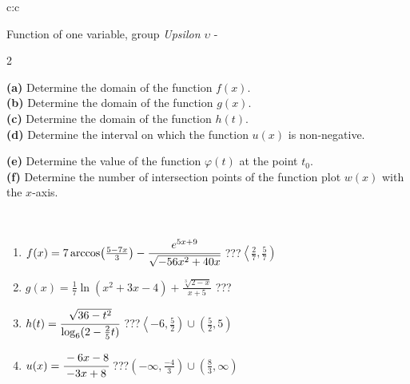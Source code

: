 \documentclass[10pt]{report}
\begin{document}
\begin{tabular}{c:c}
\begin{minipage}[c][104.5mm][t]{0.5\linewidth}
\begin{center}
\vspace{7mm}
{\huge Function of one variable, group \textit{Upsilon $\upsilon$} -}\\[5mm]
\begin{minipage}{0.95\linewidth}
\begin{center}
{\small \begin{multicols}{2} \raggedright
\textbf{(a)} Determine the domain of the function \(f(x)\). \\[1mm]
\textbf{(b)} Determine the domain of the function \(g(x)\). \\[1mm]
\textbf{(c)} Determine the domain of the function \(h(t)\). \\[1mm]
\textbf{(d)} Determine the interval on which the function \(u(x)\) is non-negative. \par \columnbreak
\textbf{(e)} Determine the value of the function \(\varphi(t)\) at the point \(t_0\). \\[1mm]
\textbf{(f)} Determine the number of intersection points of the function plot \(w(x)\) with the \(x\)-axis. \\[1mm]
\end{multicols}
}
\end{center}
\end{minipage}
\\[4mm]
\begin{minipage}{0.79\linewidth}
\begin{center}
\begin{varwidth}{\linewidth}
\begin{enumerate}
\small
\item $f(x) = 7\arccos\!\left( \frac{5-7x}{3} \right) - \cfrac{e^{5x+9}}{\sqrt{-56x^2+40x}}$\quad \dotfill\; ???\;\dotfill \quad $\left\langle\frac{2}{7} , \frac{5}{7}\right)$
\item $g(x) = \frac{1}{7} \ln{\!(x^2+3x-4)}+\frac{\sqrt[3]{2-x}}{x+5}$\quad \dotfill\; ???\;\dotfill {}
\item $h(t) = \cfrac{\sqrt{36-t^2}}{\log_6(2-\frac{2}{5}t)}$\quad \dotfill\; ???\;\dotfill \quad $\left\langle-6 , \frac{5}{2}\right)\cup\left(\frac{5}{2} , 5\right)$
\item $u(x) = \cfrac{-6x-8}{-3x+8}$\quad \dotfill\; ???\;\dotfill \quad $\left(-\infty , \frac{-4}{3}\right)\cup\left(\frac{8}{3} , \infty\right)$

\end{enumerate}
\end{varwidth}
\end{center}
\end{minipage}
\end{center}
\end{minipage}
\end{tabular}
\end{document}
